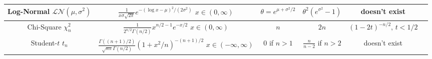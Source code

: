 \begin{center}
\begin{tabular}{cccccc}
          \hline
          \shortstack{Log-Normal                                                                                            \\ $\mathcal{LN}(\mu,\sigma^2)$} & \shortstack{$\frac{1}{x\sigma \sqrt{2\pi}}e^{-(\log x - \mu)^2/(2\sigma^2)}$\\$x \in (0, \infty)$} & $\theta = e^{ \mu + \sigma^2/2}$ & $\theta^2 (e^{\sigma^2} - 1)$ & doesn't exist\\
          \hline
          \shortstack{Chi-Square                                                                                            \\ $\chi_n^2$} & \shortstack{$\frac{1}{2^{n/2}\Gamma(n/2)}x^{n/2 - 1}e^{-x/2}$\\$x \in (0, \infty) $} & $n$  & $2n$ & $(1 - 2t)^{-n/2}, \, t < 1/2$\\
          \hline
          \shortstack{Student-$t$                                                                                           \\ $t_n$} & \shortstack{$\frac{\Gamma((n+1)/2)}{\sqrt{n\pi} \Gamma(n/2)} (1+x^2/n)^{-(n+1)/2}$\\$x \in (-\infty, \infty)$} & $0$ if $n>1$ & $\frac{n}{n-2}$ if $n>2$ & doesn't exist\\
          \hline
     \end{tabular}
\end{center}
\clearpage
\resumecol
